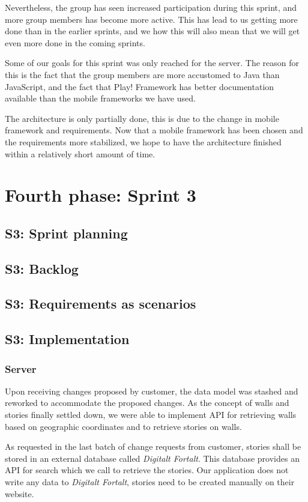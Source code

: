 \documentclass[11pt]{book}
\begin{document}
Nevertheless, the group has seen increased participation during this sprint, and more group members has become more active. This has lead to us getting more done than in the earlier sprints, and we how this will also mean that we will get even more done in the coming sprints.

Some of our goals for this sprint was only reached for the server. The reason for this is the fact that the group members are more accustomed to Java than JavaScript, and the fact that Play! Framework has better documentation available than the mobile frameworks we have used.

The architecture is only partially done, this is due to the change in mobile framework and requirements. Now that a mobile framework has been chosen and the requirements more stabilized, we hope to have the architecture finished within a relatively short amount of time.

\section{Fourth phase: Sprint 3}
\subsection{S3: Sprint planning}
\subsection{S3: Backlog}
\subsection{S3: Requirements as scenarios}

\subsection{S3: Implementation}

\subsubsection{Server}

Upon receiving changes proposed by customer, the data model was stashed and reworked to accommodate the proposed changes. As the concept of walls and stories finally settled down, we were able to implement API for retrieving walls based on geographic coordinates and to retrieve stories on walls.

As requested in the last batch of change requests from customer, stories shall be stored in an external database called \emph{Digitalt Fortalt}. This database provides an API for search which we call to retrieve the stories. Our application does not write any data to \emph{Digitalt Fortalt}, stories need to be created manually on their website.
\end{document}
